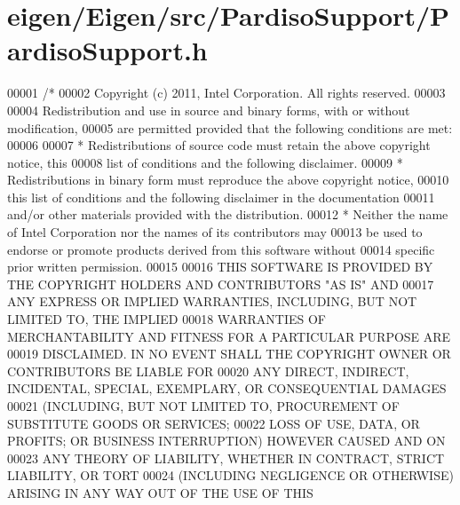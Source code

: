 \hypertarget{eigen_2_eigen_2src_2_pardiso_support_2_pardiso_support_8h_source}{}\section{eigen/\+Eigen/src/\+Pardiso\+Support/\+Pardiso\+Support.h}
\label{eigen_2_eigen_2src_2_pardiso_support_2_pardiso_support_8h_source}

\begin{DoxyCode}
00001 \textcolor{comment}{/*}
00002 \textcolor{comment}{ Copyright (c) 2011, Intel Corporation. All rights reserved.}
00003 \textcolor{comment}{}
00004 \textcolor{comment}{ Redistribution and use in source and binary forms, with or without modification,}
00005 \textcolor{comment}{ are permitted provided that the following conditions are met:}
00006 \textcolor{comment}{}
00007 \textcolor{comment}{ * Redistributions of source code must retain the above copyright notice, this}
00008 \textcolor{comment}{   list of conditions and the following disclaimer.}
00009 \textcolor{comment}{ * Redistributions in binary form must reproduce the above copyright notice,}
00010 \textcolor{comment}{   this list of conditions and the following disclaimer in the documentation}
00011 \textcolor{comment}{   and/or other materials provided with the distribution.}
00012 \textcolor{comment}{ * Neither the name of Intel Corporation nor the names of its contributors may}
00013 \textcolor{comment}{   be used to endorse or promote products derived from this software without}
00014 \textcolor{comment}{   specific prior written permission.}
00015 \textcolor{comment}{}
00016 \textcolor{comment}{ THIS SOFTWARE IS PROVIDED BY THE COPYRIGHT HOLDERS AND CONTRIBUTORS "AS IS" AND}
00017 \textcolor{comment}{ ANY EXPRESS OR IMPLIED WARRANTIES, INCLUDING, BUT NOT LIMITED TO, THE IMPLIED}
00018 \textcolor{comment}{ WARRANTIES OF MERCHANTABILITY AND FITNESS FOR A PARTICULAR PURPOSE ARE}
00019 \textcolor{comment}{ DISCLAIMED. IN NO EVENT SHALL THE COPYRIGHT OWNER OR CONTRIBUTORS BE LIABLE FOR}
00020 \textcolor{comment}{ ANY DIRECT, INDIRECT, INCIDENTAL, SPECIAL, EXEMPLARY, OR CONSEQUENTIAL DAMAGES}
00021 \textcolor{comment}{ (INCLUDING, BUT NOT LIMITED TO, PROCUREMENT OF SUBSTITUTE GOODS OR SERVICES;}
00022 \textcolor{comment}{ LOSS OF USE, DATA, OR PROFITS; OR BUSINESS INTERRUPTION) HOWEVER CAUSED AND ON}
00023 \textcolor{comment}{ ANY THEORY OF LIABILITY, WHETHER IN CONTRACT, STRICT LIABILITY, OR TORT}
00024 \textcolor{comment}{ (INCLUDING NEGLIGENCE OR OTHERWISE) ARISING IN ANY WAY OUT OF THE USE OF THIS}

\end{DoxyCode}
